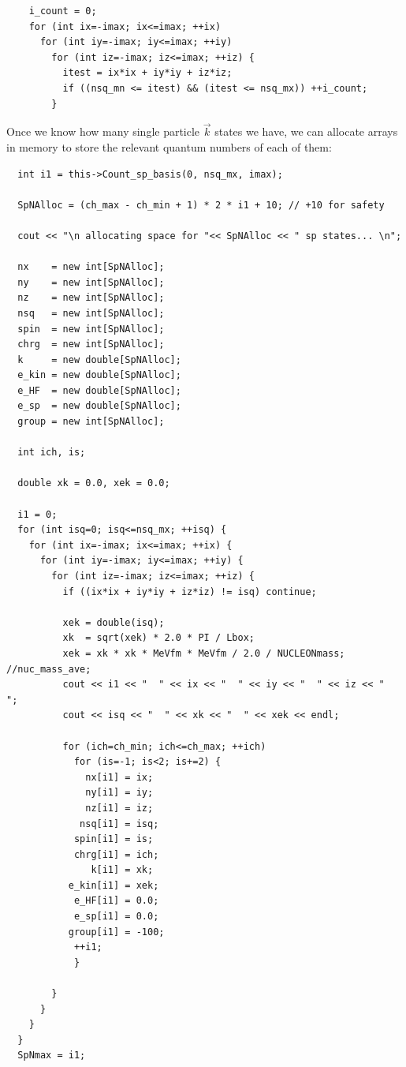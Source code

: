 \lstset{language=c++}
\begin{lstlisting}
    i_count = 0;
    for (int ix=-imax; ix<=imax; ++ix)
      for (int iy=-imax; iy<=imax; ++iy)
        for (int iz=-imax; iz<=imax; ++iz) {
          itest = ix*ix + iy*iy + iz*iz;
          if ((nsq_mn <= itest) && (itest <= nsq_mx)) ++i_count;
        }
\end{lstlisting}
Once we know how many single particle $\vec k$ states we have, we can allocate
arrays in memory to store the relevant quantum numbers of each of them:
\begin{lstlisting}
  int i1 = this->Count_sp_basis(0, nsq_mx, imax);

  SpNAlloc = (ch_max - ch_min + 1) * 2 * i1 + 10; // +10 for safety

  cout << "\n allocating space for "<< SpNAlloc << " sp states... \n";

  nx    = new int[SpNAlloc];
  ny    = new int[SpNAlloc];
  nz    = new int[SpNAlloc];
  nsq   = new int[SpNAlloc];
  spin  = new int[SpNAlloc];
  chrg  = new int[SpNAlloc];
  k     = new double[SpNAlloc];
  e_kin = new double[SpNAlloc];
  e_HF  = new double[SpNAlloc];
  e_sp  = new double[SpNAlloc];
  group = new int[SpNAlloc];

  int ich, is;

  double xk = 0.0, xek = 0.0;

  i1 = 0;
  for (int isq=0; isq<=nsq_mx; ++isq) {
    for (int ix=-imax; ix<=imax; ++ix) {
      for (int iy=-imax; iy<=imax; ++iy) {
        for (int iz=-imax; iz<=imax; ++iz) {
          if ((ix*ix + iy*iy + iz*iz) != isq) continue;

          xek = double(isq);
          xk  = sqrt(xek) * 2.0 * PI / Lbox;
          xek = xk * xk * MeVfm * MeVfm / 2.0 / NUCLEONmass;  //nuc_mass_ave;
          cout << i1 << "  " << ix << "  " << iy << "  " << iz << "  ";
          cout << isq << "  " << xk << "  " << xek << endl;

          for (ich=ch_min; ich<=ch_max; ++ich)
            for (is=-1; is<2; is+=2) {
              nx[i1] = ix;
              ny[i1] = iy;
              nz[i1] = iz;
             nsq[i1] = isq;
            spin[i1] = is;
            chrg[i1] = ich;
               k[i1] = xk;
           e_kin[i1] = xek;
            e_HF[i1] = 0.0;
            e_sp[i1] = 0.0;
           group[i1] = -100;
            ++i1;
            }

        }
      }
    }
  }
  SpNmax = i1;
\end{lstlisting}

